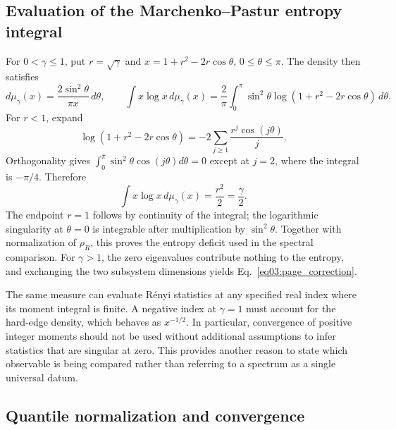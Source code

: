 \documentclass[11pt,letterpaper]{article}
\theoremstyle{plain}
\theoremstyle{definition}
\theoremstyle{remark}
\begin{document}
\subsection{Evaluation of the Marchenko--Pastur entropy integral}
\label{subsec12:entropy_integral}

For $0<\gamma\leq1$, put $r=\sqrt\gamma$ and
$x=1+r^2-2r\cos\theta$, $0\leq\theta\leq\pi$.  The density then
satisfies
\begin{equation}
\label{eq12:angular_mp}
 d\mu_\gamma(x)
 =\frac{2\sin^2\theta}{\pi x}\,d\theta,
 \qquad
 \int x\log x\,d\mu_\gamma(x)
 =\frac2\pi\int_0^\pi\sin^2\theta
       \log(1+r^2-2r\cos\theta)\,d\theta.
\end{equation}
For $r<1$, expand
\begin{equation}
 \log(1+r^2-2r\cos\theta)
 =-2\sum_{j\geq1}\frac{r^j\cos(j\theta)}{j}.
\end{equation}
Orthogonality gives
$\int_0^\pi\sin^2\theta\cos(j\theta)d\theta=0$ except at
$j=2$, where the integral is $-\pi/4$.  Therefore
\begin{equation}
\label{eq12:entropy_mp}
 \int x\log x\,d\mu_\gamma(x)=\frac{r^2}{2}=\frac\gamma2.
\end{equation}
The endpoint $r=1$ follows by continuity of the integral; the
logarithmic singularity at $\theta=0$ is integrable after multiplication
by $\sin^2\theta$.  Together with normalization of $\rho_R$, this
proves the entropy deficit used in the spectral comparison.  For
$\gamma>1$, the zero eigenvalues contribute nothing to the entropy,
and exchanging the two subsystem dimensions yields
Eq.~\eqref{eq03:page_correction}.

The same measure can evaluate R\'enyi statistics at any specified
real index where its moment integral is finite.  A negative index at
$\gamma=1$ must account for the hard-edge density, which behaves as
$x^{-1/2}$.  In particular, convergence of positive integer moments
should not be used without additional assumptions to infer statistics
that are singular at zero.  This provides another reason to state
which observable is being compared rather than referring to a
spectrum as a single universal datum.

\subsection{Quantile normalization and convergence}
\label{subsec12:quantile_convergence}
\end{document}
